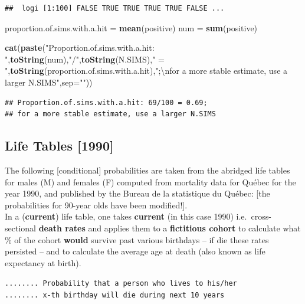 \documentclass[]{book}
\newenvironment{Shaded}{\begin{snugshade}}{\end{snugshade}}
\newcommand{\CharTok}[1]{\textcolor[rgb]{0.31,0.60,0.02}{#1}}
\newcommand{\DataTypeTok}[1]{\textcolor[rgb]{0.13,0.29,0.53}{#1}}
\newcommand{\KeywordTok}[1]{\textcolor[rgb]{0.13,0.29,0.53}{\textbf{#1}}}
\newcommand{\NormalTok}[1]{#1}
\newcommand{\StringTok}[1]{\textcolor[rgb]{0.31,0.60,0.02}{#1}}
\begin{document}
\begin{verbatim}
##  logi [1:100] FALSE TRUE TRUE TRUE TRUE FALSE ...
\end{verbatim}

\begin{Shaded}
\begin{Highlighting}[]
\NormalTok{proportion.of.sims.with.a.hit =}\StringTok{ }\KeywordTok{mean}\NormalTok{(positive)}
\NormalTok{num =}\StringTok{ }\KeywordTok{sum}\NormalTok{(positive) }

\KeywordTok{cat}\NormalTok{(}\KeywordTok{paste}\NormalTok{(}\StringTok{"Proportion.of.sims.with.a.hit: "}\NormalTok{,}\KeywordTok{toString}\NormalTok{(num),}\StringTok{"/"}\NormalTok{,}\KeywordTok{toString}\NormalTok{(N.SIMS),}\StringTok{" = "}\NormalTok{,}\KeywordTok{toString}\NormalTok{(proportion.of.sims.with.a.hit),}\StringTok{";}\CharTok{\textbackslash{}n}\StringTok{for a more stable estimate, use a larger N.SIMS"}\NormalTok{,}\DataTypeTok{sep=}\StringTok{""}\NormalTok{))}
\end{Highlighting}
\end{Shaded}

\begin{verbatim}
## Proportion.of.sims.with.a.hit: 69/100 = 0.69;
## for a more stable estimate, use a larger N.SIMS
\end{verbatim}

\hypertarget{life-tables-1990}{%
\subsection{Life Tables {[}1990{]}}\label{life-tables-1990}}

The following {[}conditional{]} probabilities are taken from the
abridged life tables for males (M) and females (F) computed
from mortality data for Québec for the year 1990, and published by the Bureau de la statistique du Québec: {[}the probabilities for 90-year olds have been modified!{]}.\\
In a (\textbf{current}) life table, one takes \textbf{current} (in this case 1990) i.e.~cross-sectional \textbf{death rates} and applies them to a \textbf{fictitious cohort} to calculate what \% of the cohort \textbf{would} survive past various birthdays -- if die these rates persisted -- and to calculate the average age at death (also known as life expectancy at birth).

\texttt{........\ Probability\ that\ a\ person\ who\ lives\ to\ his/her}\\
\texttt{........\ x-th\ birthday\ will\ die\ during\ next\ 10\ years}
\end{document}

